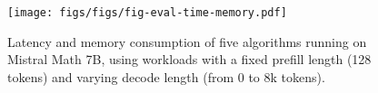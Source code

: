 \begin{figure}[ht]
\vskip -0.1in
\begin{center}
\centerline{\texttt{[image: figs/figs/fig-eval-time-memory.pdf]}}
\caption{Latency and memory consumption of five algorithms running on Mistral Math 7B, using workloads with a fixed prefill length (128 tokens) and varying decode length (from 0 to 8k tokens).}
\label{fig-eval-time-memory}
\end{center}
\vskip -0.4in
\end{figure}